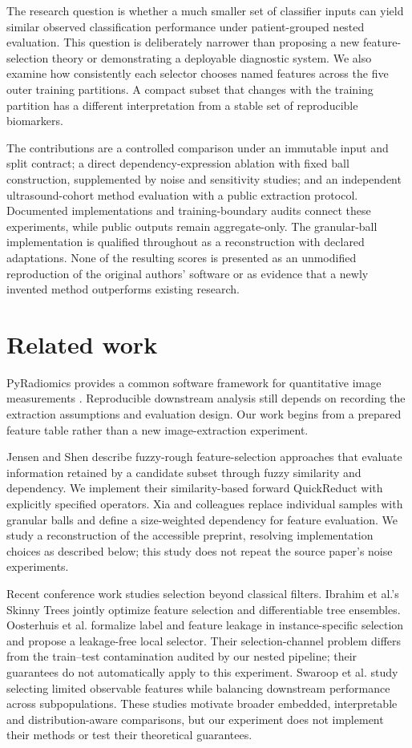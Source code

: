 \documentclass[11pt,a4paper]{article}
\begin{document}
The research question is whether a much smaller set of classifier inputs can yield similar observed classification performance under patient-grouped nested evaluation. This question is deliberately narrower than proposing a new feature-selection theory or demonstrating a deployable diagnostic system. We also examine how consistently each selector chooses named features across the five outer training partitions. A compact subset that changes with the training partition has a different interpretation from a stable set of reproducible biomarkers.

The contributions are a controlled comparison under an immutable input and split contract; a direct dependency-expression ablation with fixed ball construction, supplemented by noise and sensitivity studies; and an independent ultrasound-cohort method evaluation with a public extraction protocol. Documented implementations and training-boundary audits connect these experiments, while public outputs remain aggregate-only. The granular-ball implementation is qualified throughout as a reconstruction with declared adaptations. None of the resulting scores is presented as an unmodified reproduction of the original authors' software or as evidence that a newly invented method outperforms existing research.

\section{Related work}
PyRadiomics provides a common software framework for quantitative image measurements \cite{pyradiomics}. Reproducible downstream analysis still depends on recording the extraction assumptions and evaluation design. Our work begins from a prepared feature table rather than a new image-extraction experiment.

Jensen and Shen \cite{jensen} describe fuzzy-rough feature-selection approaches that evaluate information retained by a candidate subset through fuzzy similarity and dependency. We implement their similarity-based forward QuickReduct with explicitly specified operators. Xia and colleagues \cite{xia} replace individual samples with granular balls and define a size-weighted dependency for feature evaluation. We study a reconstruction of the accessible preprint, resolving implementation choices as described below; this study does not repeat the source paper's noise experiments.


Recent conference work studies selection beyond classical filters. Ibrahim et al.'s Skinny Trees \cite{skinnytrees} jointly optimize feature selection and differentiable tree ensembles. Oosterhuis et al. \cite{localleakage} formalize label and feature leakage in instance-specific selection and propose a leakage-free local selector. Their selection-channel problem differs from the train--test contamination audited by our nested pipeline; their guarantees do not automatically apply to this experiment. Swaroop et al. \cite{robustselection} study selecting limited observable features while balancing downstream performance across subpopulations. These studies motivate broader embedded, interpretable and distribution-aware comparisons, but our experiment does not implement their methods or test their theoretical guarantees.
\end{document}
